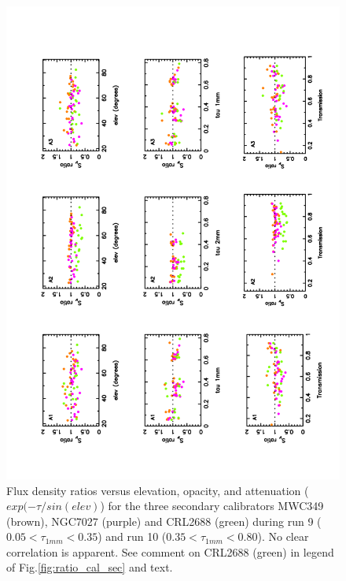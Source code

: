 \begin{figure}
\begin{center}
  \includegraphics[clip, angle=-90, scale=0.6]{Figures/Ratio_vs_elev_op_sec_r9_r10.pdf}
  \caption{Flux density ratios versus elevation, opacity, and attenuation ($exp(-\tau/sin(elev)$) for the three secondary
    calibrators  MWC349 (brown), NGC7027 (purple)  and CRL2688 (green) during run 9 ($0.05  < \tau_{1mm} < 0.35$)
    and run 10 ($0.35  < \tau_{1mm} < 0.80$). No clear  correlation is apparent. See comment on CRL2688 (green) in legend of Fig.\ref{fig:ratio_cal_sec}
    and text.}
\label{fig:corr_cal_sec}
\end{center}
\end{figure}

















